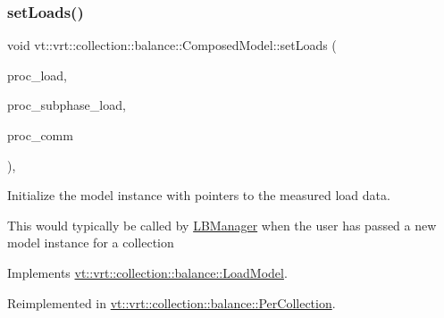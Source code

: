 \subsubsection{\texorpdfstring{set\+Loads()}{setLoads()}}
{\footnotesize\ttfamily void vt\+::vrt\+::collection\+::balance\+::\+Composed\+Model\+::set\+Loads (\begin{DoxyParamCaption}\item[{std\+::unordered\+\_\+map$<$ \hyperlink{namespacevt_a46ce6733d5cdbd735d561b7b4029f6d7}{Phase\+Type}, \hyperlink{namespacevt_1_1vrt_1_1collection_1_1balance_a45306ee4bf38fe3fb586d1ee2fa3d147}{Load\+Map\+Type} $>$ const $\ast$}]{proc\+\_\+load,  }\item[{std\+::unordered\+\_\+map$<$ \hyperlink{namespacevt_a46ce6733d5cdbd735d561b7b4029f6d7}{Phase\+Type}, \hyperlink{namespacevt_1_1vrt_1_1collection_1_1balance_a3d91523158c1025b7b665240072f3b7e}{Subphase\+Load\+Map\+Type} $>$ const $\ast$}]{proc\+\_\+subphase\+\_\+load,  }\item[{std\+::unordered\+\_\+map$<$ \hyperlink{namespacevt_a46ce6733d5cdbd735d561b7b4029f6d7}{Phase\+Type}, \hyperlink{namespacevt_1_1vrt_1_1collection_1_1balance_a10860c956804d644db54a16012352728}{Comm\+Map\+Type} $>$ const $\ast$}]{proc\+\_\+comm }\end{DoxyParamCaption})\hspace{0.3cm}{\ttfamily [override]}, {\ttfamily [virtual]}}



Initialize the model instance with pointers to the measured load data. 

This would typically be called by \hyperlink{structvt_1_1vrt_1_1collection_1_1balance_1_1_l_b_manager}{L\+B\+Manager} when the user has passed a new model instance for a collection 

Implements \hyperlink{classvt_1_1vrt_1_1collection_1_1balance_1_1_load_model_a621d040453688c70c168176b40cf90df}{vt\+::vrt\+::collection\+::balance\+::\+Load\+Model}.



Reimplemented in \hyperlink{structvt_1_1vrt_1_1collection_1_1balance_1_1_per_collection_ad749f0ca3690c9e58d4b3ab882ed4cf3}{vt\+::vrt\+::collection\+::balance\+::\+Per\+Collection}.

\mbox{\label{classvt_1_1vrt_1_1collection_1_1balance_1_1_composed_model_ad8108b4392d63b7f09e443920a64933a}} 

